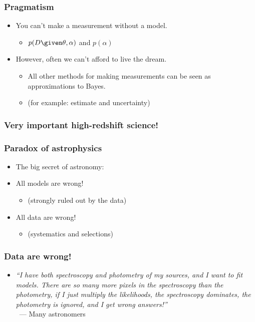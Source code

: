 \documentclass[pdftex]{beamer}
\begin{document}
\begin{frame}
  \frametitle{Pragmatism}
  \begin{itemize}
  \item You can't make a measurement without a model.
    \begin{itemize}
    \item $p(D\given\theta,\alpha)$ and $p(\alpha)$
    \end{itemize}
  \item However, often we can't afford to live the dream.
    \begin{itemize}
    \item All other methods for making measurements can be seen as
      approximations to Bayes.
    \item (for example: estimate and uncertainty)
    \end{itemize}
  \end{itemize}
\end{frame}

\begin{frame}
  \frametitle{Very important high-redshift science!}
\end{frame}

\begin{frame}
  \frametitle{Paradox of astrophysics}
  \begin{itemize}
  \item The big secret of astronomy:
  \item<2-> All models are wrong!
    \begin{itemize}
    \item (strongly ruled out by the data)
    \end{itemize}
  \item<3> All data are wrong!
    \begin{itemize}
    \item (systematics and selections)
    \end{itemize}
  \end{itemize}
\end{frame}

\begin{frame}
  \frametitle{Data are wrong!}
  \begin{itemize}
  \item \textit{``I have both spectroscopy and photometry of my sources, and I
    want to fit models. There are so many more pixels in the
    spectroscopy than the photometry, if I just multiply the
    likelihoods, the spectroscopy dominates, the photometry is
    ignored, and I get wrong answers!''} \\ ~\hfill --- Many
    astronomers
  \end{itemize}
\end{frame}
\end{document}
